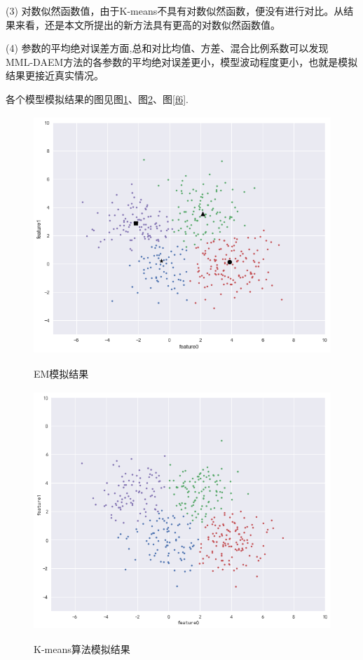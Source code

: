 \documentclass[a4paper,12pt,openany,oneside,utf-8]{ctexbook}
\begin{document}
	\noindent(3) 对数似然函数值，由于K-means不具有对数似然函数，便没有进行对比。从结果来看，还是本文所提出的新方法具有更高的对数似然函数值。
	
	\noindent(4) 参数的平均绝对误差方面,总和对比均值、方差、混合比例系数可以发现 MML-DAEM方法的各参数的平均绝对误差更小，模型波动程度更小，也就是模拟结果更接近真实情况。
	
	各个模型模拟结果的图见图\ref{f4}、图\ref{f5}、图\ref{f6}.
	
	
	\begin{figure}[H]
	\centering
	\includegraphics[width=140mm,height=90mm]{figure/1.7.png}\\
	\caption{EM模拟结果}\label{f4}
    \end{figure}
    
    	\begin{figure}[H]
	\centering
	\includegraphics[width=140mm,height=90mm]{figure/1.6.png}\\
	\caption{K-means算法模拟结果}\label{f5}
    \end{figure}
    
\end{document}
